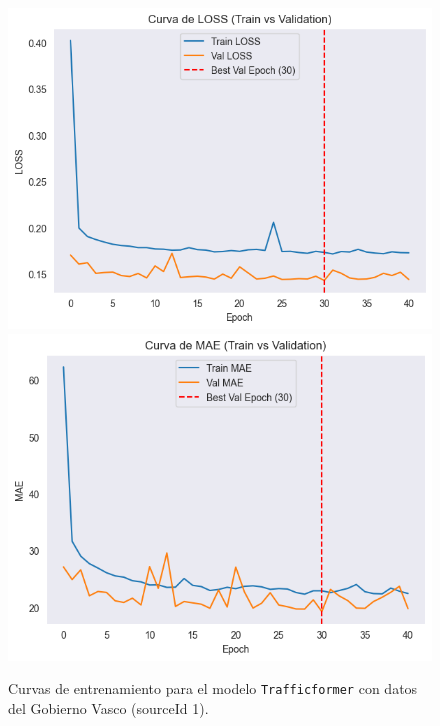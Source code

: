 \begin{figure}[H]
	\centering
	\caption{Curvas de entrenamiento para el modelo \texttt{Trafficformer} con datos del Gobierno Vasco (sourceId 1).}
	\begin{minipage}{0.48\textwidth}
		\centering
		\includegraphics[width=\linewidth]{includes/cap5/graphs/sid1_trafficformer_loss.png}
		\vspace{0.2cm}
		\includegraphics[width=\linewidth]{includes/cap5/graphs/sid1_trafficformer_mae.png}
		\vspace{0.2cm}

\end{minipage}
\end{figure}
